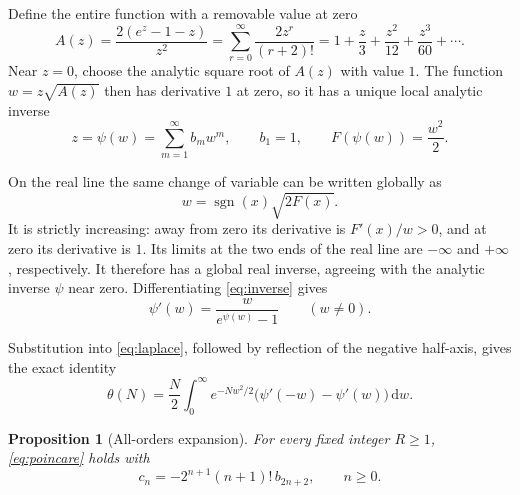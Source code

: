 \documentclass[11pt,letterpaper]{article}
\numberwithin{equation}{section}
\newtheorem{proposition}[theorem]{Proposition}
\theoremstyle{remark}
\newcommand{\dd}{\,\mathrm{d}}
\begin{document}
Define the entire function with a removable value at zero
\begin{equation}
 A(z)=\frac{2(e^z-1-z)}{z^2}
 =\sum_{r=0}^\infty\frac{2z^r}{(r+2)!}
 =1+\frac z3+\frac{z^2}{12}+\frac{z^3}{60}+\cdots.
 \label{eq:A}
\end{equation}
Near $z=0$, choose the analytic square root of $A(z)$ with value $1$.
The function $w=z\sqrt{A(z)}$ then has derivative $1$ at zero, so it has a
unique local analytic inverse
\begin{equation}
 z=\psi(w)=\sum_{m=1}^\infty b_mw^m,
 \qquad b_1=1,
 \qquad F(\psi(w))=\frac{w^2}{2}.
 \label{eq:inverse}
\end{equation}

On the real line the same change of variable can be written globally as
\[
 w=\operatorname{sgn}(x)\sqrt{2F(x)}.
\]
It is strictly increasing: away from zero its derivative is $F'(x)/w>0$,
and at zero its derivative is $1$. Its limits at the two ends of the real
line are $-\infty$ and $+\infty$, respectively. It therefore has a global
real inverse, agreeing with the analytic inverse $\psi$ near zero.
Differentiating \eqref{eq:inverse} gives
\begin{equation}
 \psi'(w)=\frac{w}{e^{\psi(w)}-1}\qquad(w\ne0).
 \label{eq:derivative}
\end{equation}

Substitution into \eqref{eq:laplace}, followed by reflection of the negative
half-axis, gives the exact identity
\begin{equation}
 \theta(N)=\frac N2\int_0^\infty e^{-Nw^2/2}
              \bigl(\psi'(-w)-\psi'(w)\bigr)\dd w.
 \label{eq:gaussian}
\end{equation}

\begin{proposition}[All-orders expansion]
\label{prop:asymp}
For every fixed integer $R\geq1$, \eqref{eq:poincare} holds with
\begin{equation}
 c_n=-2^{n+1}(n+1)!\,b_{2n+2},\qquad n\geq0.
 \label{eq:bcoeff}
\end{equation}
\end{proposition}
\end{document}
